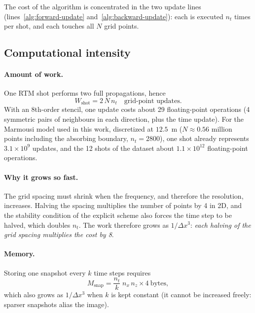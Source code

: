 \documentclass[letterpaper,11pt,leqno]{article}
\begin{document}
The cost of the algorithm is concentrated in the two update lines (lines~\ref{alg:forward-update} and~\ref{alg:backward-update}): each is executed $n_t$ times per shot, and each touches all $N$ grid points.

\subsection{Computational intensity}

\paragraph{Amount of work.}
One RTM shot performs two full propagations, hence
\begin{equation}
  W_{\text{shot}} = 2\, N\, n_t \quad \text{grid-point updates.}
\end{equation}
With an 8th-order stencil, one update costs about 29 floating-point operations
(4 symmetric pairs of neighbours in each direction, plus the time update). For
the Marmousi model used in this work, discretized at $12.5$~m ($N \approx 0.56$
million points including the absorbing boundary, $n_t = 2800$), one shot already
represents $3.1\times10^{9}$ updates, and the 12 shots of the dataset about
$1.1\times10^{12}$ floating-point operations.

\paragraph{Why it grows so fast.}
The grid spacing must shrink when the frequency, and therefore the resolution,
increases. Halving the spacing multiplies the number of points by 4 in 2D, and
the stability condition of the explicit scheme also forces the time step to be
halved, which doubles $n_t$. The work therefore grows as $1/\Delta x^{3}$:
\emph{each halving of the grid spacing multiplies the cost by 8}.

\paragraph{Memory.}
Storing one snapshot every $k$ time steps requires
\begin{equation}
  M_{\text{snap}} = \frac{n_t}{k}\; n_x\, n_z \times 4 \ \text{bytes},
\end{equation}
which also grows as $1/\Delta x^{3}$ when $k$ is kept constant (it cannot be
increased freely: sparser snapshots alias the image).
\end{document}
